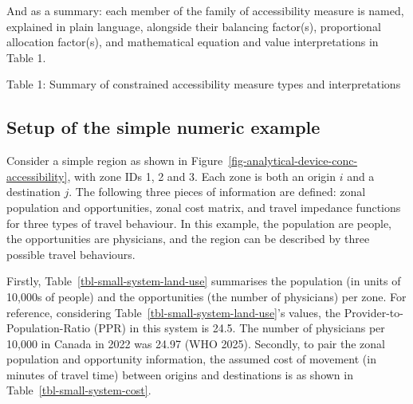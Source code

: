 \documentclass[
]{article}
\begin{document}
And as a summary: each member of the family of accessibility measure is
named, explained in plain language, alongside their balancing factor(s),
proportional allocation factor(s), and mathematical equation and value
interpretations in Table 1.



Table 1: Summary of constrained accessibility measure types and
interpretations

\subsection{Setup of the simple numeric
example}\label{setup-of-the-simple-numeric-example}

Consider a simple region as shown in
Figure~\ref{fig-analytical-device-conc-accessibility}, with zone IDs 1,
2 and 3. Each zone is both an origin \(i\) and a destination \(j\). The
following three pieces of information are defined: zonal population and
opportunities, zonal cost matrix, and travel impedance functions for
three types of travel behaviour. In this example, the population are
people, the opportunities are physicians, and the region can be
described by three possible travel behaviours.

Firstly, Table~\ref{tbl-small-system-land-use} summarises the population
(in units of 10,000s of people) and the opportunities (the number of
physicians) per zone. For reference, considering
Table~\ref{tbl-small-system-land-use}'s values, the
Provider-to-Population-Ratio (PPR) in this system is 24.5. The number of
physicians per 10,000 in Canada in 2022 was 24.97 (WHO 2025). Secondly,
to pair the zonal population and opportunity information, the assumed
cost of movement (in minutes of travel time) between origins and
destinations is as shown in Table~\ref{tbl-small-system-cost}.
\end{document}

